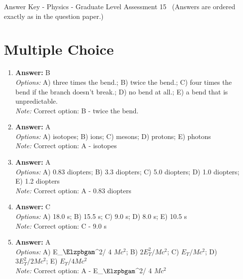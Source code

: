 \documentclass[12pt]{article}
\begin{document}
\begin{center}
Answer Key - Physics - Graduate Level Assessment 15 \
\small (Answers are ordered exactly as in the question paper.)
\end{center}

\section*{Multiple Choice}
\begin{enumerate}[label=\arabic*.]
\item \textbf{Answer:} B
\\ \textit{Options:} A) three times the bend.; B) twice the bend.; C) four times the bend if the branch doesn't break.; D) no bend at all.; E) a bend that is unpredictable.
\\ \textit{Note:} Correct option: B - twice the bend.
\item \textbf{Answer:} A
\\ \textit{Options:} A) isotopes; B) ions; C) mesons; D) protons; E) photons
\\ \textit{Note:} Correct option: A - isotopes
\item \textbf{Answer:} A
\\ \textit{Options:} A) 0.83 diopters; B) 3.3 diopters; C) 5.0 diopters; D) 1.0 diopters; E) 1.2 diopters
\\ \textit{Note:} Correct option: A - 0.83 diopters
\item \textbf{Answer:} C
\\ \textit{Options:} A) 18.0 s; B) 15.5 s; C) 9.0 s; D) 8.0 s; E) 10.5 s
\\ \textit{Note:} Correct option: C - 9.0 s
\item \textbf{Answer:} A
\\ \textit{Options:} A) E\_\ensuremath{\Elzpbgam}^2/ 4 $Mc^2$; B) \( 2 E_{\Upsilon}^2 / Mc^2 \); C) \( E_{\Upsilon} / Mc^2 \); D) \( 3 E_{\Upsilon}^2 / 2 Mc^2 \); E) \( E_{\Upsilon} / 4 Mc^2 \)
\\ \textit{Note:} Correct option: A - E\_\ensuremath{\Elzpbgam}^2/ 4 $Mc^2$
\end{enumerate}
\end{document}
